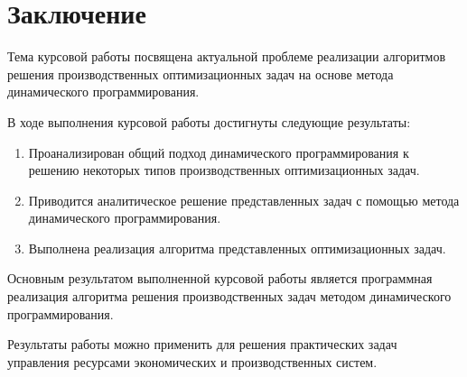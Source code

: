 \section*{Заключение}

\indent Тема курсовой работы посвящена актуальной проблеме реализации алгоритмов решения производственных оптимизационных задач на основе метода динамического программирования.

В ходе выполнения курсовой работы достигнуты следующие результаты:
\begin{enumerate}[wide]
    \item Проанализирован общий подход динамического программирования к решению некоторых типов производственных оптимизационных задач.
    \item Приводится аналитическое решение представленных задач с помощью метода динамического программирования.
    \item Выполнена реализация алгоритма представленных оптимизационных задач.
\end{enumerate}

Основным результатом выполненной курсовой работы является программная реализация алгоритма решения производственных задач методом динамического программирования.

Результаты работы можно применить для решения практических задач управления ресурсами экономических и производственных систем.
